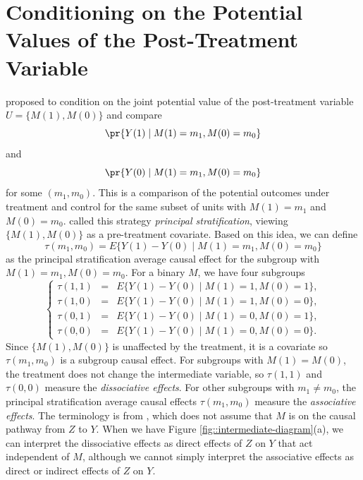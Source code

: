 \section{Conditioning on the Potential Values of the Post-Treatment Variable}


\citet{frangakis2002principal} proposed to condition on the joint potential value of the post-treatment variable $U = \{ M(1), M(0) \}$ and compare
$$
\pr\{  Y(1) \mid M(1) = m_1, M(0) = m_0 \}
$$
and
$$
\pr\{  Y(0) \mid M(1) = m_1, M(0) = m_0 \}
$$
for some $(m_1, m_0)$. This is a comparison of the potential outcomes under treatment and control for the same subset of units with $M(1) = m_1$ and $ M(0) = m_0$. \citet{frangakis2002principal} called this strategy {\it principal stratification}, viewing $\{ M(1), M(0) \}$ as a pre-treatment covariate.  Based on this idea, we can define 
$$
\tau(m_1, m_0) = E\{  Y(1) - Y(0) \mid M(1) = m_1, M(0) = m_0\}
$$
as the principal stratification average causal effect for the subgroup with $M(1) = m_1, M(0) = m_0$. For a binary $M$, we have four subgroups
\begin{equation}
\label{eq::psace}
\left\{ \begin{array}{rcl}
\tau(1,1) &=& E\{  Y(1) - Y(0) \mid M(1) = 1, M(0) =1\} ,\\
\tau(1,0) &=&E\{  Y(1) - Y(0) \mid M(1) = 1, M(0) =0\},\\
\tau(0,1) &=&E\{  Y(1) - Y(0) \mid M(1) = 0, M(0) =1\},\\
\tau(0,0) &=&E\{  Y(1) - Y(0) \mid M(1) = 0, M(0) = 0 \}.
\end{array} 
\right.
\end{equation}
Since  $\{ M(1), M(0) \}$ is unaffected by the treatment, it is a covariate so $\tau(m_1, m_0) $ is a subgroup causal effect. For subgroups with $M(1) = M(0)$, the treatment does not change the intermediate variable, so  $\tau(1,1) $ and $\tau(0,0)$ measure the {\it dissociative effects}. 
For other subgroups with $m_1 \neq m_0$, the principal stratification average causal effects $\tau(m_1, m_0) $ measure the {\it associative effects}. The terminology is from \citet{frangakis2002principal}, which does not assume that $M$ is on the causal pathway from $Z$ to $Y$. When we have Figure \ref{fig::intermediate-diagram}(a), we can interpret the dissociative effects as direct effects of $Z$ on $Y$ that act independent of $M$, although we cannot simply interpret the associative effects as direct or indirect effects of $Z$ on $Y$. 

 

